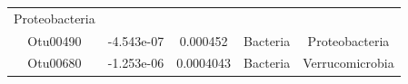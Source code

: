 \documentclass[]{article}
\begin{document}
\begin{longtable}[]{@{}ccccc@{}}
\begin{minipage}[t]{0.27\columnwidth}
Proteobacteria\strut
\end{minipage}\tabularnewline
\begin{minipage}[t]{0.13\columnwidth}\centering\strut
Otu00490\strut
\end{minipage} & \begin{minipage}[t]{0.16\columnwidth}\centering\strut
-4.543e-07\strut
\end{minipage} & \begin{minipage}[t]{0.14\columnwidth}\centering\strut
0.000452\strut
\end{minipage} & \begin{minipage}[t]{0.13\columnwidth}\centering\strut
Bacteria\strut
\end{minipage} & \begin{minipage}[t]{0.27\columnwidth}\centering\strut
Proteobacteria\strut
\end{minipage}\tabularnewline
\begin{minipage}[t]{0.13\columnwidth}\centering\strut
Otu00680\strut
\end{minipage} & \begin{minipage}[t]{0.16\columnwidth}\centering\strut
-1.253e-06\strut
\end{minipage} & \begin{minipage}[t]{0.14\columnwidth}\centering\strut
0.0004043\strut
\end{minipage} & \begin{minipage}[t]{0.13\columnwidth}\centering\strut
Bacteria\strut
\end{minipage} & \begin{minipage}[t]{0.27\columnwidth}\centering\strut
Verrucomicrobia\strut
\end{minipage}\tabularnewline
\bottomrule
\end{longtable}
\end{document}
